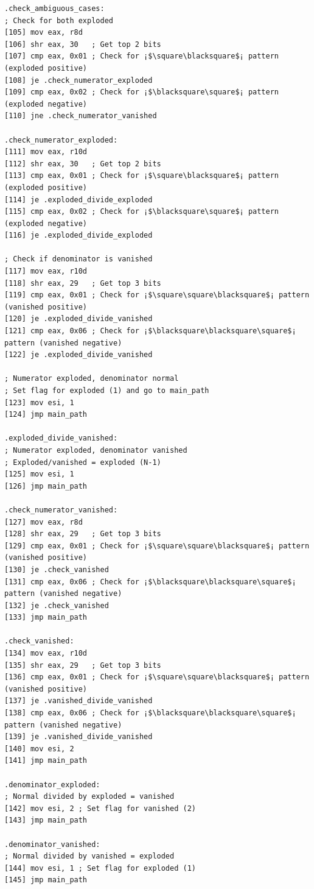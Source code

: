 \documentclass[12pt,letter]{article}
\begin{document}
\begin{lstlisting}[style=rust, caption={Full complex division assembly instructions including ambiguous handling}, label={fig:circle_divide}]
.check_ambiguous_cases:
; Check for both exploded
[105] mov eax, r8d
[106] shr eax, 30   ; Get top 2 bits
[107] cmp eax, 0x01 ; Check for ¡$\square\blacksquare$¡ pattern (exploded positive)
[108] je .check_numerator_exploded
[109] cmp eax, 0x02 ; Check for ¡$\blacksquare\square$¡ pattern (exploded negative)
[110] jne .check_numerator_vanished

.check_numerator_exploded:
[111] mov eax, r10d
[112] shr eax, 30   ; Get top 2 bits
[113] cmp eax, 0x01 ; Check for ¡$\square\blacksquare$¡ pattern (exploded positive)
[114] je .exploded_divide_exploded
[115] cmp eax, 0x02 ; Check for ¡$\blacksquare\square$¡ pattern (exploded negative)
[116] je .exploded_divide_exploded

; Check if denominator is vanished
[117] mov eax, r10d
[118] shr eax, 29   ; Get top 3 bits
[119] cmp eax, 0x01 ; Check for ¡$\square\square\blacksquare$¡ pattern (vanished positive)
[120] je .exploded_divide_vanished
[121] cmp eax, 0x06 ; Check for ¡$\blacksquare\blacksquare\square$¡ pattern (vanished negative)
[122] je .exploded_divide_vanished

; Numerator exploded, denominator normal
; Set flag for exploded (1) and go to main_path
[123] mov esi, 1
[124] jmp main_path

.exploded_divide_vanished:
; Numerator exploded, denominator vanished
; Exploded/vanished = exploded (N-1)
[125] mov esi, 1
[126] jmp main_path

.check_numerator_vanished:
[127] mov eax, r8d
[128] shr eax, 29   ; Get top 3 bits
[129] cmp eax, 0x01 ; Check for ¡$\square\square\blacksquare$¡ pattern (vanished positive)
[130] je .check_vanished
[131] cmp eax, 0x06 ; Check for ¡$\blacksquare\blacksquare\square$¡ pattern (vanished negative)
[132] je .check_vanished
[133] jmp main_path

.check_vanished:
[134] mov eax, r10d
[135] shr eax, 29   ; Get top 3 bits
[136] cmp eax, 0x01 ; Check for ¡$\square\square\blacksquare$¡ pattern (vanished positive)
[137] je .vanished_divide_vanished
[138] cmp eax, 0x06 ; Check for ¡$\blacksquare\blacksquare\square$¡ pattern (vanished negative)
[139] je .vanished_divide_vanished
[140] mov esi, 2
[141] jmp main_path

.denominator_exploded:
; Normal divided by exploded = vanished
[142] mov esi, 2 ; Set flag for vanished (2)
[143] jmp main_path

.denominator_vanished:
; Normal divided by vanished = exploded
[144] mov esi, 1 ; Set flag for exploded (1)
[145] jmp main_path


\end{lstlisting}
\end{document}
